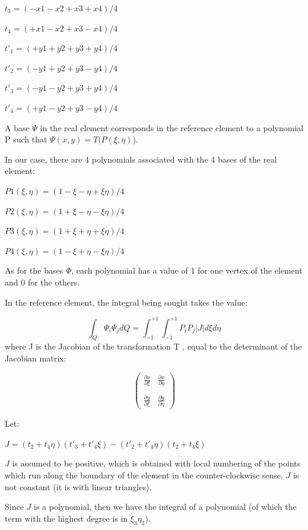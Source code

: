 $t_{3} = ( -x1 - x2 + x3 + x4 ) / 4$

$t_{4} = ( +x1 - x2 + x3 - x4 ) / 4$

$t'_{1} = ( +y1 + y2 + y3 + y4 ) / 4$

$t'_{2} = ( -y1 + y2 + y3 - y4 ) / 4$

$t'_{3} = ( -y1 - y2 + y3 + y4 ) / 4$

$t'_{4} = ( +y1 - y2 + y3 - y4 ) / 4$

A base $\Psi$ in the real element corresponds in the reference element to a
polynomial P such that $\Psi(x,y)  =  T(P(\xi,\eta)$).

In our case, there are 4 polynomials associated with the 4 bases of the real element:

$P1(\xi,\eta) = ( 1 - \xi- \eta + \xi\eta)/4$

$P2(\xi,\eta) = ( 1 + \xi- \eta - \xi\eta)/4$

$P3(\xi,\eta) = ( 1 + \xi+ \eta + \xi\eta)/4$

$P4(\xi,\eta) = ( 1 - \xi+ \eta - \xi\eta)/4$

As for the bases $\Phi$, each polynomial has a value of 1 for one vertex of the
element and 0 for the others.

In the reference element, the integral being sought takes the value:

\[\int _{Q}\Psi _{i}  \Psi _{j} dQ=\int _{-1}^{+1}\int _{-1}^{+1}P_{i} P_{j} \left|J\right|d\xi d\eta   \]
where J is the Jacobian of the transformation T , equal to the determinant of the Jacobian matrix:

\[
\left(
\begin{array}{cc}
  \frac{\partial{x}}{\partial{\xi}} & \frac{\partial{x}}{\partial{\eta}} \\
  \\
  \frac{\partial{y}}{\partial{\xi}} & \frac{\partial{y}}{\partial{\eta}}
\end{array}
\right)
\]

Let:

$J = (t_{2}+t_{4}\eta) (t'_{3}+t'_{4}\xi) - (t'_{2}+t'_{4}\eta) (t_{2}+t_{4}\xi)$

$J$ is assumed to be positive, which is obtained with local numbering of the
points which run along the boundary of the element in the counter-clockwise
sense. $J$ is not constant (it is with linear triangles).

Since $J$ is a polynomial, then we have the integral of a polynomial (of which
the term with the highest degree is in $\xi _{3}\eta _{3}$).

